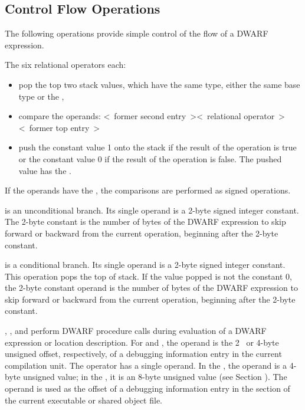\subsection{Control Flow Operations}
\label{chap:controlflowoperations}
The
following operations provide simple control of the flow of a DWARF expression.
\begin{enumerate}[1. ]
\itembfnl{\DWOPleTARG, \DWOPgeTARG, \DWOPeqTARG, \DWOPltTARG, \DWOPgtTARG, \DWOPneTARG}
The six relational operators each:
\begin{itemize}
\item pop the top two stack values, which have the same type,
either the same base type or the \generictype,

\item compare the operands:
\linebreak
\textless~former second entry~\textgreater  \textless~relational operator~\textgreater \textless~former top entry~\textgreater

\item push the constant value 1 onto the stack
if the result of the operation is true or the
constant value 0 if the result of the operation is false.
The pushed value has the \generictype.
\end{itemize}

If the operands have the \generictype, the comparisons
are performed as signed operations.

\itembfnl{\DWOPskipTARG}
\DWOPskipNAME{} is an unconditional branch. Its single operand
is a 2-byte signed integer constant. The 2-byte constant is
the number of bytes of the DWARF expression to skip forward
or backward from the current operation, beginning after the
2-byte constant.

\itembfnl{\DWOPbraTARG}
\DWOPbraNAME{} is a conditional branch. Its single operand is a
2-byte signed integer constant.  This operation pops the
top of stack. If the value popped is not the constant 0,
the 2-byte constant operand is the number of bytes of the
DWARF expression to skip forward or backward from the current
operation, beginning after the 2-byte constant.

\itembfnl{\DWOPcalltwoTARG, \DWOPcallfourTARG, \DWOPcallrefTARG}
\DWOPcalltwoNAME,
\DWOPcallfourNAME,
and \DWOPcallrefNAME{} perform
DWARF procedure calls during evaluation of a DWARF expression or
location description.
For \DWOPcalltwoNAME{} and \DWOPcallfourNAME{},
the operand is the 2\dash~ or 4-byte unsigned offset, respectively,
of a debugging information entry in the current compilation
unit. The \DWOPcallrefNAME{} operator has a single operand. In the
\thirtytwobitdwarfformat,
the operand is a 4-byte unsigned value;
in the \sixtyfourbitdwarfformat, it is an 8-byte unsigned value
(see Section
\bb
{}).
\eb
The operand is used as the offset of a
debugging information entry in
\bb
the \dotdebuginfo{} section of the current executable or shared object file.
\eb



\end{enumerate}
